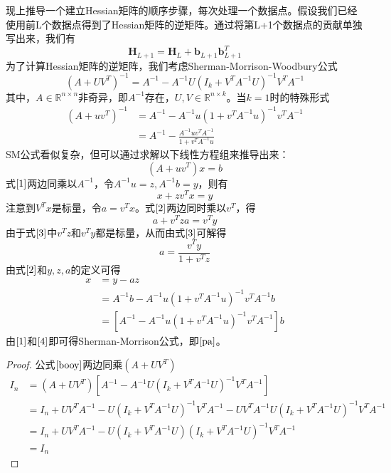 现上推导一个建立Hessian矩阵的顺序步骤，每次处理一个数据点。假设我们已经使用前L个数据点得到了Hessian矩阵的逆矩阵。通过将第L+1个数据点的贡献单独写出来，我们有
\begin{equation}
	\boldsymbol{H}_{L+1}=\boldsymbol{H}_L+\boldsymbol{b}_{L+1}\boldsymbol{b}_{L+1}^T
\end{equation}
为了计算Hessian矩阵的逆矩阵，我们考虑Sherman-Morrison-Woodbury公式
\begin{equation}
\label{booy}
	(A+UV^T)^{-1}=A^{-1}-A^{-1}U(I_k+V^TA^{-1}U)^{-1}V^TA^{-1}
\end{equation}
其中，$A\in \mathbb{R}^{n\times n}$非奇异，即$A^{-1}$存在，$U,V\in \mathbb{R}^{n\times k}$。当$k=1$时的特殊形式
\begin{equation}
\begin{aligned}\label{pa}
		(A+uv^T)^{-1}&=A^{-1}-A^{-1}u(1+v^TA^{-1}u)^{-1}v^TA^{-1}\\
		&=A^{-1}-\frac{A^{-1}uv^TA^{-1}}{1+v^TA^{-1}u}
\end{aligned}
\end{equation}
SM公式看似复杂，但可以通过求解以下线性方程组来推导出来：
\begin{equation}
\label{1}
	(A+uv^T)x=b
\end{equation}
式$\ref{1}$两边同乘以$A^{-1}$，令$A^{-1}u=z,A^{-1}b=y$，则有
\begin{equation}
\label{2}
	x+zv^Tx=y
\end{equation}
注意到$V^Tx$是标量，令$a=v^Tx$。式$\ref{2}$两边同时乘以$v^T$，得
\begin{equation}
\label{3}
	a+v^Tza=v^Ty
\end{equation}
由于式$\ref{3}$中$v^Tz$和$v^Ty$都是标量，从而由式$\ref{3}$可解得
\begin{equation}
	a=\frac{v^Ty}{1+v^Tz}
\end{equation}
由式$\ref{2}$和$y,z,a$的定义可得
\begin{equation}
\label{4}
	\begin{aligned}
	x&=y-az\\
	&=A^{-1}b-A^{-1}u(1+v^TA^{-1}u)^{-1}v^TA^{-1}b\\
	&=\left[A^{-1}-A^{-1}u(1+v^TA^{-1}u)^{-1}v^TA^{-1} \right]b
	\end{aligned}
\end{equation}
由$\ref{1}$和$\ref{4}$即可得Sherman-Morrison公式，即$\ref{pa}$。
\begin{proof}
	公式$\ref{booy}$两边同乘$(A+UV^T)$
	\begin{equation}
		\begin{aligned}
		I_n&=(A+UV^T)\left[A^{-1}-A^{-1}U(I_k+V^TA^{-1}U)^{-1}V^TA^{-1}\right]\\
		&=I_n+UV^TA^{-1}-U(I_k+V^TA^{-1}U)^{-1}V^TA^{-1}-UV^TA^{-1}U(I_k+V^TA^{-1}U)^{-1}V^TA^{-1}\\
		&=I_n+UV^TA^{-1}-U(I_k+V^TA^{-1}U)(I_k+V^TA^{-1}U)^{-1}V^TA^{-1}\\
		&=I_n
		\end{aligned}
	\end{equation}
\end{proof}
